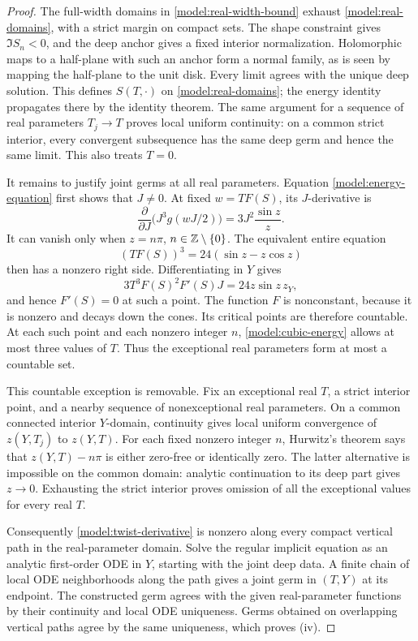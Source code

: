 \begin{proof}
The full-width domains in \eqref{model:real-width-bound} exhaust
\eqref{model:real-domains}, with a strict margin on compact sets.
The shape constraint gives \(\Im S_n<0\), and the deep anchor
gives a fixed interior normalization.  Holomorphic maps to a
half-plane with such an anchor form a normal family, as is seen by
mapping the half-plane to the unit disk.  Every limit agrees with
the unique deep solution.  This defines \(S(T,\cdot)\) on
\eqref{model:real-domains}; the energy identity propagates there
by the identity theorem.
The same argument for a sequence of real parameters \(T_j\to T\)
proves local uniform continuity: on a common strict interior,
every convergent subsequence has the same deep germ and hence the
same limit.  This also treats \(T=0\).

It remains to justify joint germs at all real parameters.
Equation \eqref{model:energy-equation} first shows that \(J\ne0\).
At fixed \(w=TF(S)\), its \(J\)-derivative is
\begin{equation}
\label{model:twist-derivative}
 \frac{\partial}{\partial J}\bigl(J^3g(wJ/2)\bigr)
       =3J^2\frac{\sin z}{z}.
\end{equation}
It can vanish only when \(z=n\pi\), \(n\in\mathbb Z\setminus\{0\}\).
The equivalent entire equation
\begin{equation}
\label{model:cubic-energy}
 (TF(S))^3=24(\sin z-z\cos z)
\end{equation}
then has a nonzero right side.  Differentiating in \(Y\) gives
\[
 3T^3F(S)^2F'(S)J=24z\sin z\,z_Y,
\]
and hence \(F'(S)=0\) at such a point.
The function \(F\) is nonconstant, because it is nonzero and
decays down the cones.  Its critical points are therefore
countable.  At each such point and each nonzero integer \(n\),
\eqref{model:cubic-energy} allows at most three values of \(T\).
Thus the exceptional real parameters form at most a countable set.

This countable exception is removable.  Fix an exceptional real
\(T\), a strict interior point, and a nearby sequence of
nonexceptional real parameters.  On a common connected interior
\(Y\)-domain, continuity gives local uniform convergence of
\(z(Y,T_j)\) to \(z(Y,T)\).  For each fixed nonzero integer \(n\),
Hurwitz's theorem says that \(z(Y,T)-n\pi\) is either zero-free
or identically zero.  The latter alternative is impossible on
the common domain: analytic continuation to its deep part gives
\(z\to0\).  Exhausting the strict interior proves omission of all
the exceptional values for every real \(T\).

Consequently \eqref{model:twist-derivative} is nonzero along every
compact vertical path in the real-parameter domain.  Solve the
regular implicit equation as an analytic first-order ODE in \(Y\),
starting with the joint deep data.  A finite chain of local ODE
neighborhoods along the path gives a joint germ in \((T,Y)\) at
its endpoint.  The constructed germ agrees with the given
real-parameter functions by their continuity and local ODE
uniqueness.  Germs obtained on overlapping vertical paths agree
by the same uniqueness, which proves \textup{(iv)}.
\end{proof}

